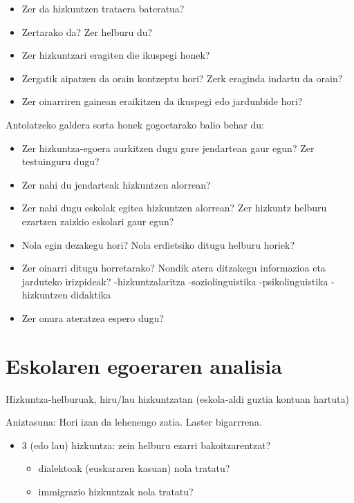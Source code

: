 \documentclass[
]{book}
\providecommand{\tightlist}{%
  \setlength{\itemsep}{0pt}\setlength{\parskip}{0pt}}
\begin{document}
\begin{itemize}
\tightlist
\item
  Zer da hizkuntzen trataera bateratua?
\item
  Zertarako da? Zer helburu du?
\item
  Zer hizkuntzari eragiten die ikuspegi honek?
\item
  Zergatik aipatzen da orain kontzeptu hori? Zerk eraginda indartu da orain?
\item
  Zer oinarriren gainean eraikitzen da ikuspegi edo jardunbide hori?
\end{itemize}

Antolatzeko galdera sorta honek gogoetarako balio behar du:

\begin{itemize}
\tightlist
\item
  Zer hizkuntza-egoera aurkitzen dugu gure jendartean gaur egun? Zer testuinguru dugu?
\item
  Zer nahi du jendarteak hizkuntzen alorrean?
\item
  Zer nahi dugu eskolak egitea hizkuntzen alorrean? Zer hizkuntz helburu ezartzen zaizkio eskolari gaur egun?
\item
  Nola egin dezakegu hori? Nola erdietsiko ditugu helburu horiek?
\item
  Zer oinarri ditugu horretarako? Nondik atera ditzakegu informazioa eta jarduteko irizpideak?
  -hizkuntzalaritza
  -soziolinguistika
  -psikolinguistika
  -hizkuntzen didaktika
\item
  Zer onura ateratzea espero dugu?
\end{itemize}

\hypertarget{eskolaren-egoeraren-analisia}{%
\section{Eskolaren egoeraren analisia}\label{eskolaren-egoeraren-analisia}}

Hizkuntza-helburuak, hiru/lau hizkuntzatan (eskola-aldi guztia kontuan hartuta)

Aniztasuna: Hori izan da lehenengo zatia. Laster bigarrrena.

\begin{itemize}
\tightlist
\item
  3 (edo lau) hizkuntza: zein helburu ezarri bakoitzarentzat?

  \begin{itemize}
  \tightlist
  \item
    dialektoak (euskararen kasuan) nola tratatu?
  \item
    immigrazio hizkuntzak nola tratatu?
  \end{itemize}
\end{itemize}
\end{document}
